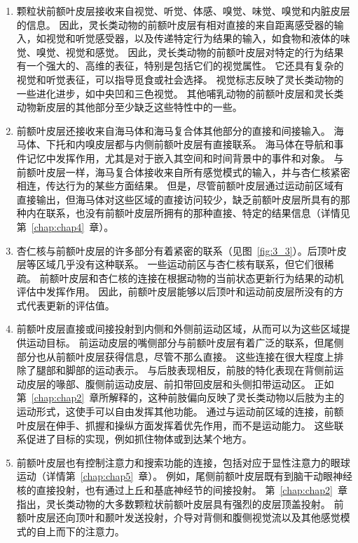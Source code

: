 \begin{enumerate}
\item 颗粒状前额叶皮层接收来自视觉、听觉、体感、嗅觉、味觉、嗅觉和内脏皮层的信息。
因此，灵长类动物的前额叶皮层有相对直接的来自距离感受器的输入，如视觉和听觉感受器，以及传递特定行为结果的输入，如食物和液体的味觉、嗅觉、视觉和感觉。
因此，灵长类动物的前额叶皮层对特定的行为结果有一个强大的、高维的表征，特别是包括它们的视觉属性。
它还具有复杂的视觉和听觉表征，可以指导觅食或社会选择。
视觉标志反映了灵长类动物的一些进化进步，如中央凹和三色视觉。
其他哺乳动物的前额叶皮层和灵长类动物新皮层的其他部分至少缺乏这些特性中的一些。

\item 前额叶皮层还接收来自海马体和海马复合体其他部分的直接和间接输入。
海马体、下托和内嗅皮层都与内侧前额叶皮层有直接联系。
海马体在导航和事件记忆中发挥作用，尤其是对于嵌入其空间和时间背景中的事件和对象。
与前额叶皮层一样，海马复合体接收来自所有感觉模式的输入，并与杏仁核紧密相连，传达行为的某些方面结果。
但是，尽管前额叶皮层通过运动前区域有直接输出，但海马体对这些区域的直接访问较少，缺乏前额叶皮层所具有的那种内在联系，也没有前额叶皮层所拥有的那种直接、特定的结果信息（详情见第~\ref{chap:chap4}~章）。


\item 杏仁核与前额叶皮层的许多部分有着紧密的联系（见图~\ref{fig:3_3}）。后顶叶皮层等区域几乎没有这种联系。
一些运动前区与杏仁核有联系，但它们很稀疏\cite{avendan1983evidence}。
前额叶皮层和杏仁核的连接在根据动物的当前状态更新行为结果的动机评估中发挥作用。
因此，前额叶皮层能够以后顶叶和运动前皮层所没有的方式代表更新的评估值。

\item 前额叶皮层直接或间接投射到内侧和外侧前运动区域，从而可以为这些区域提供运动目标。
前运动皮层的嘴侧部分与前额叶皮层有着广泛的联系，但尾侧部分也从前额叶皮层获得信息，尽管不那么直接。
这些连接在很大程度上排除了腿部和脚部的运动表示。
与后肢表现相反，前肢的特化表现在背侧前运动皮层的喙部\cite{tachibana2004input}、腹侧前运动皮层\cite{he1993topographic}、前扣带回皮层\cite{luppino1991multiple}和头侧扣带运动区\cite{he1995topographic}。
正如第~\ref{chap:chap2}~章所解释的，这种前肢偏向反映了灵长类动物以后肢为主的运动形式，这使手可以自由发挥其他功能。
通过与运动前区域的连接，前额叶皮层在伸手、抓握和操纵方面发挥着优先作用，而不是运动能力。
这些联系促进了目标的实现，例如抓住物体或到达某个地方。


\item 前额叶皮层也有控制注意力和搜索功能的连接，包括对应于显性注意力的眼球运动（详情第~\ref{chap:chap5}~章）。
例如，尾侧前额叶皮层既有到脑干动眼神经核的直接投射，也有通过上丘和基底神经节的间接投射。
第~\ref{chap:chap2}~章指出，灵长类动物的大多数颗粒状前额叶皮层具有强烈的皮层顶盖投射\cite{leichnetz1981prefrontal}。
前额叶皮层还向顶叶和颞叶发送投射，介导对背侧和腹侧视觉流以及其他感觉模式的自上而下的注意力。



\end{enumerate}
